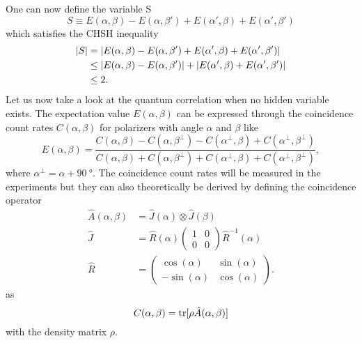 One can now define the variable S
\begin{equation}
S\equiv E(\alpha,\beta)-E(\alpha,\beta')+E(\alpha',\beta)+E(\alpha',\beta')
\label{eq:a:S}
\end{equation}
which satisfies the CHSH inequality
\begin{subequations}
\label{eq:a:CHSH}
\begin{align}
\abs{S}
    &=\abs{E(\alpha,\beta)-E(\alpha,\beta')+E(\alpha',\beta)+E(\alpha',\beta')}
    \label{eq:a:CHSH:1}\\
    &\leq \abs{E(\alpha,\beta)-E(\alpha,\beta')}+\abs{E(\alpha',\beta)+E(\alpha',\beta')}
    \label{eq:a:CHSH:2}\\
    &\leq 2
    \label{eq:a:CHSH:3}.
\end{align}
\end{subequations}
Let us now take a look at the quantum correlation when no hidden variable exists.
The expectation value $E(\alpha,\beta)$ can be expressed through the coincidence count rates $C(\alpha,\beta)$ for polarizers with angle $\alpha$ and $\beta$ like
\begin{equation}
E(\alpha,\beta)=\frac{C(\alpha,\beta)-C(\alpha,\beta^\perp)-C(\alpha^\perp,\beta)+C(\alpha^\perp,\beta^\perp)}{C(\alpha,\beta)+C(\alpha,\beta^\perp)+C(\alpha^\perp,\beta)+C(\alpha^\perp,\beta^\perp)},
\label{eq:a:EC}
\end{equation}
where $\alpha^\perp=\alpha+\SI{90}{\degree}$.
The coincidence count rates will be measured in the experiments but they can also theoretically be derived by defining the coincidence operator
\begin{align}
\hat A(\alpha,\beta)
    &=\hat J(\alpha)\otimes \hat J(\beta)
    \label{eq:a:A}\\
\hat J
    &=\hat R(\alpha) \begin{pmatrix}
    1&0\\0&0
    \end{pmatrix}\hat R^{-1}(\alpha)
    \label{eq:a:J}\\
\hat R
    &=\begin{pmatrix}
    \cos(\alpha)&\sin(\alpha)\\
    -\sin(\alpha)&\cos(\alpha)
    \end{pmatrix}.
    \label{eq:a:R}
\end{align}
as
\begin{equation}
C(\alpha,\beta)   = \trace[\rho \hat A(\alpha,\beta)]
\label{eq:a:CA}
\end{equation}
with the density matrix $\rho$.
